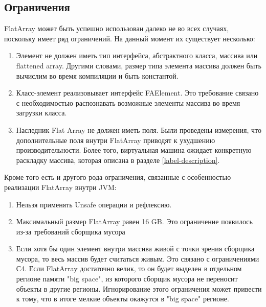\subsection{Ограничения} \label{limitation}
FlatArray может быть успешно использован далеко не во всех случаях, поскольку имеет ряд ограничений. На данный момент их существует несколько:
\begin{enumerate}
	\item Элемент не должен иметь тип интерфейса, абстрактного класса, массива или flattened array. Другими словами, размер типа элемента массива должен быть вычислим во время компиляции и быть константой.
	\item Класс-элемент реализовывает интерфейс FAElement. Это требование связано с необходимостью распознавать возможные элементы массива во время загрузки класса.
	\item Наследник Flat Array не должен иметь поля. Были проведены измерения, что дополнительные поля внутри FlatArray приводят к ухудшению производительности. Более того, виртуальная машина ожидает конкретную раскладку массива, которая описана в разделе \ref{label-description}.
\end{enumerate}
\par
Кроме того есть и другого рода ограничения, связанные с особенностью реализации FlatArray внутри JVM: 
\begin{enumerate}
	\item Нельзя применять Unsafe операции и рефлексию.
	\item Максимальный размер FlatArray равен 16 GB. Это ограничение появилось из-за требований сборщика мусора
	\item Если хотя бы один элемент внутри массива живой с точки зрения сборщика мусора, то весь массив будет считаться живым. Это связано с ограничениями С4. Если FlatArray достаточно велик, то он будет выделен в отдельном регионе памяти "big space", из которого сборщик мусора не переносит объекты в другие регионы. Игнорирование этого ограничения может привести к тому, что в итоге мелкие объекты окажутся в "big space" регионе.
\end{enumerate}

